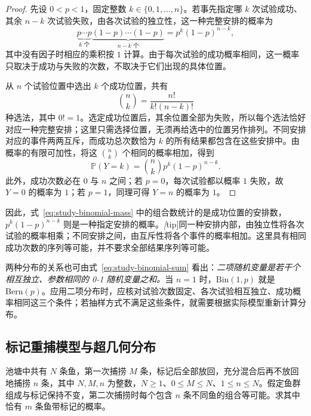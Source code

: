 \documentclass[UTF8,12pt,a4paper,fontset=fandol]{ctexbook}
\begin{document}
\begin{proof}
先设 $0<p<1$，固定整数 $k\in\{0,1,\ldots,n\}$。若事先指定哪 $k$ 次试验成功、其余 $n-k$ 次试验失败，由各次试验的独立性，这一种完整安排的概率为
\[
  \underbrace{p\cdots p}_{k\text{ 个}}
  \underbrace{(1-p)\cdots(1-p)}_{n-k\text{ 个}}
  =p^k(1-p)^{n-k},
\]
其中没有因子时相应的乘积按 $1$ 计算。由于每次试验的成功概率相同，这一概率只取决于成功与失败的次数，不取决于它们出现的具体位置。

从 $n$ 个试验位置中选出 $k$ 个成功位置，共有
\[
  \binom nk=\frac{n!}{k!(n-k)!}
\]
种选法，其中 $0!=1$。选定成功位置后，其余位置全部为失败，所以每个选法恰好对应一种完整安排；这里只需选择位置，无须再给选中的位置另作排列。不同安排对应的事件两两互斥，而成功总次数恰为 $k$ 的所有结果都包含在这些安排中。由概率的有限可加性，将这 $\binom nk$ 个相同的概率相加，得到
\[
  \mathbb P(Y=k)=\binom nk p^k(1-p)^{n-k}.
\]
此外，成功次数必在 $0$ 与 $n$ 之间；若 $p=0$，每次试验都以概率 $1$ 失败，故 $Y=0$ 的概率为 $1$；若 $p=1$，同理可得 $Y=n$ 的概率为 $1$。
\end{proof}

因此，式~\eqref{eq:study-binomial-mass} 中的组合数统计的是成功位置的安排数，$p^k(1-p)^{n-k}$ 则是一种指定安排的概率。\emph[tip]{同一种安排内部，由独立性将各次试验的概率相乘；不同安排之间，由互斥性将各个事件的概率相加。}这里具有相同成功次数的序列等可能，并不要求全部结果序列等可能。

两种分布的关系也可由式~\eqref{eq:study-binomial-sum} 看出：\emph{二项随机变量是若干个相互独立、参数相同的 0-1 随机变量之和。}当 $n=1$ 时，$\mathrm{Bin}(1,p)$ 就是 $\mathrm{Bern}(p)$。应用二项分布时，应核对试验次数固定、各次试验相互独立、成功概率相同这三个条件；若抽样方式不满足这些条件，就需要根据实际模型重新计算分布。

\subsection{标记重捕模型与超几何分布}
\label{subsec:study-capture-recapture}

\begin{example}
\label{ex:study-capture-recapture}
池塘中共有 $N$ 条鱼，第一次捕捞 $M$ 条，标记后全部放回，充分混合后再不放回地捕捞 $n$ 条，其中 $N,M,n$ 为整数，$N\ge1$、$0\le M\le N$、$1\le n\le N$。假定鱼群组成与标记保持不变，第二次捕捞时每个包含 $n$ 条不同鱼的组合等可能。求其中恰有 $m$ 条鱼带标记的概率。
\end{example}
\end{document}
